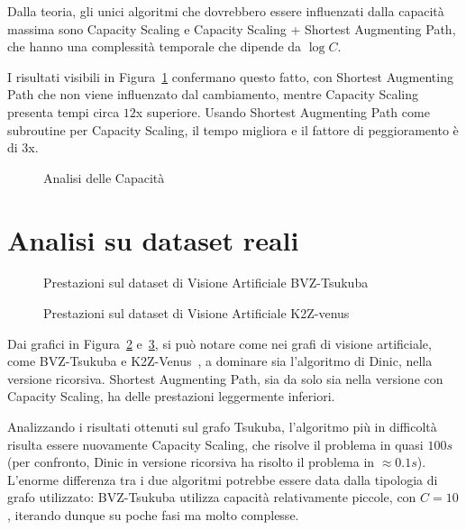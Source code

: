 \documentclass[11pt]{report}
\begin{document}
    Dalla teoria, gli unici algoritmi che dovrebbero essere influenzati dalla capacità massima sono Capacity Scaling e Capacity Scaling + Shortest Augmenting Path, che hanno una complessità temporale che dipende da $\log C$.

    I risultati visibili in Figura~\ref{fig:capacita} confermano questo fatto, con Shortest Augmenting Path che non viene influenzato dal cambiamento, mentre Capacity Scaling presenta tempi circa $12$x superiore.
    Usando Shortest Augmenting Path come subroutine per Capacity Scaling, il tempo migliora e il fattore di peggioramento è di $3$x.

    \begin{figure}[ht]
        \centering
        \resizebox{0.9\textwidth}{!}{}
        \caption{Analisi delle Capacità}
        \label{fig:capacita}
    \end{figure}

    \section{Analisi su dataset reali}\label{sec:analisi_reale}

    \begin{figure}[p]
        \centering
        \resizebox{0.9\textwidth}{!}{}
        \caption{Prestazioni sul dataset di Visione Artificiale BVZ-Tsukuba}
        \label{fig:real_tsukuba}
    \end{figure}

    \begin{figure}[p]
        \centering
        \resizebox{0.9\textwidth}{!}{}
        \caption{Prestazioni sul dataset di Visione Artificiale K2Z-venus}
        \label{fig:real_venus}
    \end{figure}

    Dai grafici in Figura~\ref{fig:real_tsukuba} e~\ref{fig:real_venus}, si può notare come nei grafi di visione artificiale, come BVZ-Tsukuba e K2Z-Venus~\cite{dataset}, a dominare sia l'algoritmo di Dinic, nella versione ricorsiva.
    Shortest Augmenting Path, sia da solo sia nella versione con Capacity Scaling, ha delle prestazioni leggermente inferiori.

    Analizzando i risultati ottenuti sul grafo Tsukuba, l'algoritmo più in difficoltà risulta essere nuovamente Capacity Scaling, che risolve il problema in quasi $100s$ (per confronto, Dinic in versione ricorsiva ha risolto il problema in $\approx 0.1s$).
    L'enorme differenza tra i due algoritmi potrebbe essere data dalla tipologia di grafo utilizzato: BVZ-Tsukuba utilizza capacità relativamente piccole, con $C = 10$, iterando dunque su poche fasi ma molto complesse.
\end{document}
